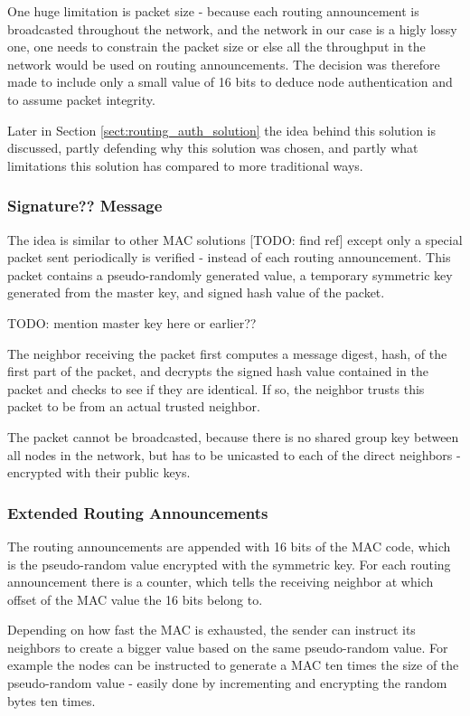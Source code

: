 One huge limitation is packet size - because each routing announcement is
broadcasted throughout the network, and the network in our case is a higly lossy
one, one needs to constrain the packet size or else all the throughput in the
network would be used on routing announcements. The decision was therefore made to
include only a small value of 16 bits to deduce node authentication and to
assume packet integrity.

Later in Section \ref{sect:routing_auth_solution} the idea  behind this
solution is discussed, partly defending why this solution was chosen, and partly
what limitations this solution has compared to more traditional ways.

\subsubsection*{Signature?? Message}

The idea is similar to other \ac{MAC} solutions [TODO: find ref] except only a
special packet sent periodically is verified - instead of each routing announcement.
This packet contains a pseudo-randomly generated value, a temporary symmetric
key generated from the master key, and signed hash value of the packet.

TODO: mention master key here or earlier??

The neighbor receiving the packet first computes a message digest, hash, of the
first part of the packet, and decrypts the signed hash value contained in the
packet and checks to see if they are identical. If so, the neighbor trusts this
packet to be from an actual trusted neighbor.

The packet cannot be broadcasted, because there is no shared group key between
all nodes in the network, but has to be unicasted to each of the direct
neighbors - encrypted with their public keys.

\subsubsection*{Extended Routing Announcements}

The routing announcements are appended with 16 bits of the \ac{MAC} code, which
is the pseudo-random value encrypted with the symmetric key. For each routing
announcement there is a counter, which tells the receiving neighbor at which
offset of the \ac{MAC} value the 16 bits belong to.

Depending on how fast the \ac{MAC} is exhausted, the sender can instruct its
neighbors to create a bigger value based on the same pseudo-random value. For
example the nodes can be instructed to generate a \ac{MAC} ten times the size of
the pseudo-random value - easily done by incrementing and encrypting the random
bytes ten times.

